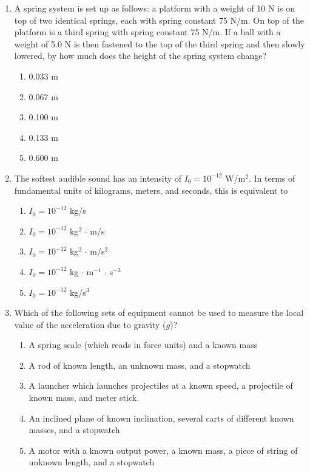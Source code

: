 \documentclass[12pt,letterpaper]{article}
\begin{document}
\begin{enumerate}[resume]
\item
A spring system is set up as follows: a platform with a weight of 10 N is on top of two identical springs, each with spring constant 75 N/m. On top of the platform is a third spring with spring constant 75 N/m. If a ball with a weight of 5.0 N is then fastened to the top of the third spring and then slowly lowered, by how much does the height of the spring system change?
\begin{enumerate}
\item 0.033 m
\item 0.067 m
\item 0.100 m
\item 0.133 m
\item 0.600 m
\end{enumerate}

\item
The softest audible sound has an intensity of $I_0 = 10^{-12}$ W/m$^2$. In terms of fundamental units of kilograms, meters, and seconds, this is equivalent to
\begin{enumerate}
\item $I_0 = 10^{-12}$ kg/s
\item $I_0 = 10^{-12}$ kg$^2\,\cdot\,$m/s
\item $I_0 = 10^{-12}$ kg$^2\,\cdot\,$m/s$^2$
\item $I_0 = 10^{-12}$ kg$\,\cdot\,$m$^{-1}\,\cdot\,$s$^{-3}$
\item $I_0 = 10^{-12}$ kg/s$^3$
\end{enumerate}

\item
Which of the following sets of equipment cannot be used to measure the local value of the acceleration due to gravity ($g$)?
\begin{enumerate}
\item A spring scale (which reads in force units) and a known mass
\item A rod of known length, an unknown mass, and a stopwatch
\item A launcher which launches projectiles at a known speed, a projectile of known mass, and meter stick.
\item An inclined plane of known inclination, several carts of different known masses, and a stopwatch
\item A motor with a known output power, a known mass, a piece of string of unknown length, and a stopwatch
\end{enumerate}


\end{enumerate}
\end{document}

